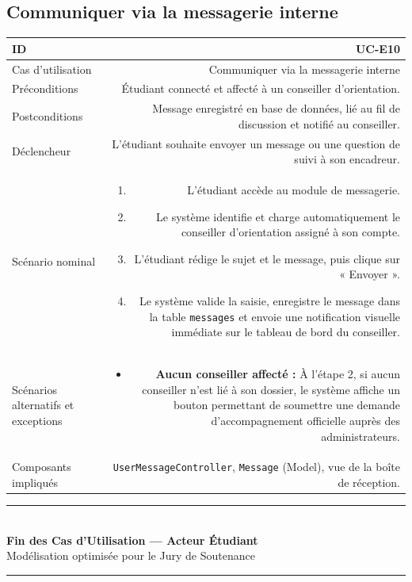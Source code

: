 \vspace{1.5em}

\subsection{Communiquer via la messagerie interne}

\noindent
{}
\begin{tabularx}{\linewidth}{|L|R|}
\hline
{}ID & UC-E10 \\
\hline
Cas d'utilisation & Communiquer via la messagerie interne \\
\hline
{}Préconditions & Étudiant connecté et affecté à un conseiller d'orientation. \\
\hline
Postconditions & Message enregistré en base de données, lié au fil de discussion et notifié au conseiller. \\
\hline
{}Déclencheur & L'étudiant souhaite envoyer un message ou une question de suivi à son encadreur. \\
\hline
Scénario nominal &
\begin{enumerate}[nosep,leftmargin=*]
  \item L'étudiant accède au module de messagerie.
  \item Le système identifie et charge automatiquement le conseiller d'orientation assigné à son compte.
  \item L'étudiant rédige le sujet et le message, puis clique sur « Envoyer ».
  \item Le système valide la saisie, enregistre le message dans la table \texttt{messages} et envoie une notification visuelle immédiate sur le tableau de bord du conseiller.
\end{enumerate} \\
\hline
{}Scénarios alternatifs et exceptions &
\begin{itemize}[nosep,leftmargin=*]
  \item \textbf{Aucun conseiller affecté :} À l'étape 2, si aucun conseiller n'est lié à son dossier, le système affiche un bouton permettant de soumettre une demande d'accompagnement officielle auprès des administrateurs.
\end{itemize} \\
\hline
Composants impliqués & \texttt{UserMessageController}, \texttt{Message} (Model), vue de la boîte de réception. \\
\hline
\end{tabularx}

\vspace{2em}
\begin{center}
{\color{primaryColor}\rule{\linewidth}{1.5pt}}\\[0.4em]
{\small\textbf{Fin des Cas d'Utilisation --- Acteur Étudiant}}\\[0.2em]
{\small Modélisation optimisée pour le Jury de Soutenance}\\[0.4em]
{\color{primaryColor}\rule{\linewidth}{1.5pt}}
\end{center}
